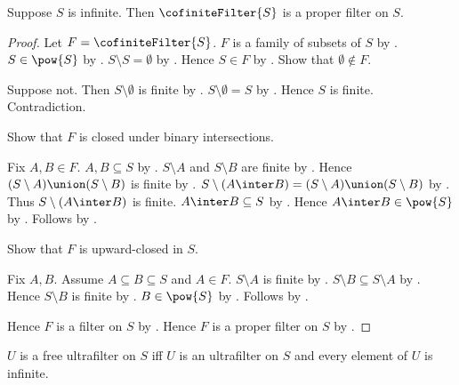 \begin{theorem}\label{cofinite_filter_is_proper_filter}
    Suppose $S$ is infinite.
    Then $\cofiniteFilter{S}$ is a proper filter on $S$.
\end{theorem}
\begin{proof}
    Let $F=\cofiniteFilter{S}$.
    $F$ is a family of subsets of $S$
        by .
    $S\in\pow{S}$ by .
    $S\setminus S=\emptyset$ by .
    Hence $S\in F$ by .
    Show that $\emptyset\notin F$.
    \begin{subproof}
        Suppose not.
        Then $S\setminus\emptyset$ is finite by .
        $S\setminus\emptyset=S$ by .
        Hence $S$ is finite.
        Contradiction.
    \end{subproof}
    Show that $F$ is closed under binary intersections.
    \begin{subproof}
        Fix $A,B\in F$.
        $A,B\subseteq S$ by .
        $S\setminus A$ and $S\setminus B$ are finite
            by .
        Hence $(S\setminus A)\union(S\setminus B)$ is finite
            by .
        $S\setminus(A\inter B)
            =(S\setminus A)\union(S\setminus B)$
            by .
        Thus $S\setminus(A\inter B)$ is finite.
        $A\inter B\subseteq S$ by .
        Hence $A\inter B\in\pow{S}$ by .
        Follows by .
    \end{subproof}
    Show that $F$ is upward-closed in $S$.
    \begin{subproof}
        Fix $A,B$.
        Assume $A\subseteq B\subseteq S$ and $A\in F$.
        $S\setminus A$ is finite by .
        $S\setminus B\subseteq S\setminus A$
            by .
        Hence $S\setminus B$ is finite
            by .
        $B\in\pow{S}$ by .
        Follows by .
    \end{subproof}
    Hence $F$ is a filter on $S$ by .
    Hence $F$ is a proper filter on $S$ by .
\end{proof}

\begin{definition}\label{free_ultrafilter}
    $U$ is a free ultrafilter on $S$ iff
        $U$ is an ultrafilter on $S$ and every element of $U$ is infinite.
\end{definition}

